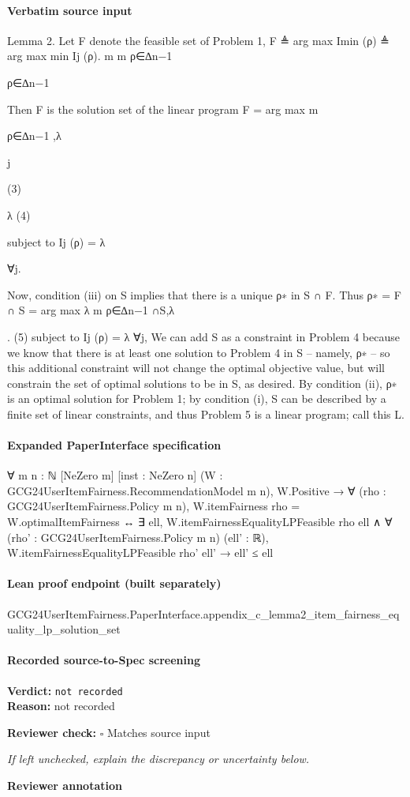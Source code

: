 \documentclass[10pt]{article}
\newcommand{\reviewerbox}{%
  \par\noindent\fbox{\parbox{0.96\linewidth}{\rule{0pt}{0.38in}}}\par
}
\newcommand{\reviewmatch}[1]{%
  \par\noindent\textbf{Reviewer check:} $\square$\; #1\par
  \noindent\emph{If left unchecked, explain the discrepancy or uncertainty below.}\par
}
\begin{document}
\paragraph{Verbatim source input}
\begin{ReviewVerbatim}
Lemma 2. Let F denote the feasible set of Problem 1,
F ≜ arg max
Imin (ρ) ≜ arg max
min Ij (ρ).
m
m
ρ∈∆n−1

ρ∈∆n−1

Then F is the solution set of the linear program
F = arg max
m

ρ∈∆n−1 ,λ

j

(3)

λ
(4)

subject to Ij (ρ) = λ

∀j.

Now, condition (iii) on S implies that there is a unique ρ∗ in S ∩ F. Thus
ρ∗ = F ∩ S = arg
max
λ
m
ρ∈∆n−1 ∩S,λ

.
(5)
subject to Ij (ρ) = λ ∀j,
We can add S as a constraint in Problem 4 because we know that there is at least one solution to
Problem 4 in S – namely, ρ∗ – so this additional constraint will not change the optimal objective
value, but will constrain the set of optimal solutions to be in S, as desired.
By condition (ii), ρ∗ is an optimal solution for Problem 1; by condition (i), S can be described by a
finite set of linear constraints, and thus Problem 5 is a linear program; call this L.
\end{ReviewVerbatim}


\paragraph{Expanded PaperInterface specification}
\begin{ReviewVerbatim}
∀ {m n : ℕ} [NeZero m] [inst : NeZero n] (W : GCG24UserItemFairness.RecommendationModel m n),
  W.Positive →
    ∀ (rho : GCG24UserItemFairness.Policy m n),
      W.itemFairness rho = W.optimalItemFairness ↔
        ∃ ell,
          W.itemFairnessEqualityLPFeasible rho ell ∧
            ∀ (rho' : GCG24UserItemFairness.Policy m n) (ell' : ℝ),
              W.itemFairnessEqualityLPFeasible rho' ell' → ell' ≤ ell
\end{ReviewVerbatim}

\paragraph{Lean proof endpoint (built separately)}\begin{ReviewVerbatim}
GCG24UserItemFairness.PaperInterface.appendix_c_lemma2_item_fairness_equality_lp_solution_set
\end{ReviewVerbatim}

\paragraph{Recorded source-to-Spec screening}
\textbf{Verdict:} \texttt{not recorded}
\\
\textbf{Reason:} not recorded
\reviewmatch{Matches source input}
\noindent\textbf{Reviewer annotation}\par
\reviewerbox
\end{document}
